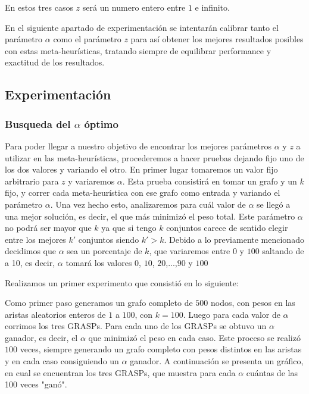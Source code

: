 En estos tres casos $z$ será un numero entero entre $1$ e infinito.

En el siguiente apartado de experimentación se intentarán calibrar tanto el parámetro $\alpha$ como el parámetro $z$ para así obtener los mejores resultados posibles con estas meta-heurísticas, tratando siempre de equilibrar performance y exactitud de los resultados.

\subsection{Experimentación}

\subsubsection{Busqueda del $\alpha$ óptimo}

Para poder llegar a nuestro objetivo de encontrar los mejores parámetros $\alpha$ y $z$ a utilizar en las meta-heurísticas, procederemos a hacer pruebas dejando fijo uno de los dos valores y variando el otro.
En primer lugar tomaremos un valor fijo arbitrario para $z$ y variaremos $\alpha$. Esta prueba consistirá en tomar un grafo y un $k$ fijo, y correr cada meta-heurística con ese grafo como entrada y variando el parámetro $\alpha$. Una vez hecho esto, analizaremos para cuál valor de $\alpha$ se llegó a una mejor solución, es decir, el que más minimizó el peso total. Este parámetro $\alpha$ no podrá ser mayor que $k$ ya que si tengo $k$ conjuntos carece de sentido elegir entre los mejores $k'$ conjuntos siendo $k'>k$. Debido a lo previamente mencionado decidimos que $\alpha$ sea un porcentaje de $k$, que variaremos entre $0$ y $100$ saltando de a 10, es decir, $\alpha$ tomará los valores $0$, $10$, $20$,...,$90$ y $100$ 

Realizamos un primer experimento que consistió en lo siguiente:

Como primer paso generamos un grafo completo de $500$ nodos, con pesos en las aristas aleatorios enteros de $1$ a $100$, con $k=100$. Luego para cada valor de $\alpha$ corrimos los tres GRASPs. Para cada uno de los GRASPs se obtuvo un $\alpha$ ganador, es decir, el $\alpha$ que minimizó el peso en cada caso. Este proceso se realizó $100$ veces, siempre generando un grafo completo con pesos distintos en las aristas y en cada caso consiguiendo un $\alpha$ ganador. A continuación se presenta un gráfico, en cual se encuentran los tres GRASPs, que muestra para cada $\alpha$ cuántas de las 100 veces "ganó". 

